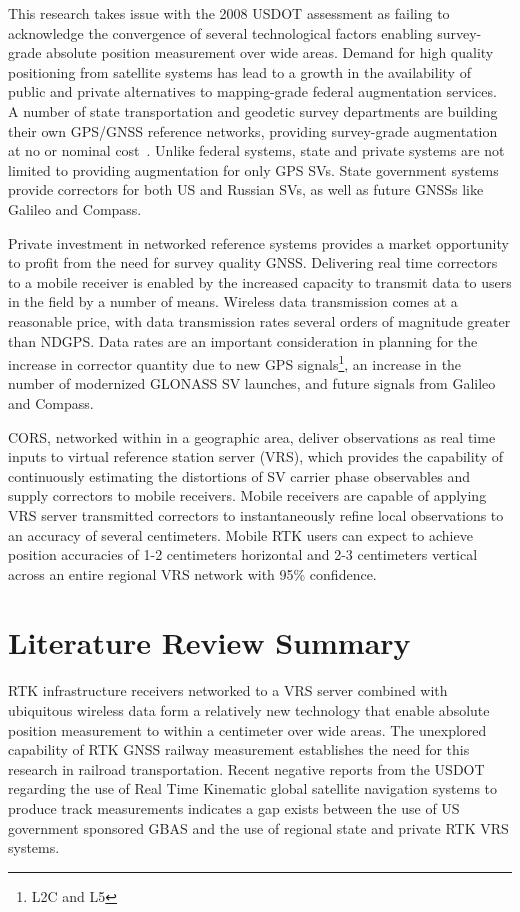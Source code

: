 This research takes issue with the 2008 USDOT assessment as failing to acknowledge the convergence of several technological factors enabling survey-grade absolute position measurement over wide areas. Demand for high quality positioning from satellite systems has lead to a growth in the availability of public and private alternatives to mapping-grade federal augmentation services. A number of state transportation and geodetic survey departments are building their own GPS/GNSS reference networks, providing survey-grade augmentation at no or nominal cost~\cite{ODOTvrs,MDOTvrs,NCvrs,KYCORS}. Unlike federal systems, state and private systems are not limited to providing augmentation for only GPS SVs. State government systems provide correctors for both US and Russian SVs, as well as future GNSSs like Galileo and Compass.

Private investment in networked reference systems provides a market opportunity to profit from the need for survey quality GNSS. Delivering real time correctors to a mobile receiver is enabled by the increased capacity to transmit data to users in the field by a number of means. Wireless data transmission comes at a reasonable price, with data transmission rates several orders of magnitude greater than NDGPS. Data rates are an important consideration in planning for the increase in corrector quantity due to new GPS signals\footnote{L2C and L5}, an increase in the number of modernized GLONASS SV launches, and future signals from Galileo and Compass.

CORS, networked within in a geographic area, deliver observations as real time inputs to virtual reference station server (VRS), which provides the capability of continuously estimating the distortions of SV carrier phase observables and supply correctors to mobile receivers.  Mobile receivers are capable of applying VRS server transmitted correctors to instantaneously refine local observations to an accuracy of several centimeters. Mobile RTK users can expect to achieve position accuracies of 1-2 centimeters horizontal and 2-3 centimeters vertical across an entire regional VRS network with 95\% confidence.

\section{Literature Review Summary}

RTK infrastructure receivers networked to a VRS server combined with ubiquitous wireless data form a relatively new technology that enable absolute position measurement to within a centimeter over wide areas. The unexplored capability of RTK GNSS railway measurement establishes the need for this research in railroad transportation. Recent negative reports from the USDOT regarding the use of Real Time Kinematic global satellite navigation systems to produce track measurements indicates a gap exists between the use of US government sponsored GBAS and the use of regional state and private RTK VRS systems.

